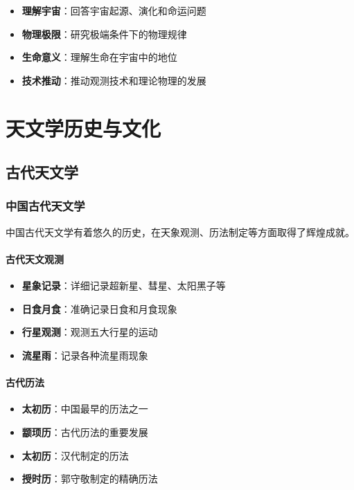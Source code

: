 \documentclass[12pt,UTF8]{ctexbook}
\begin{document}
\begin{itemize}
  \item \textbf{理解宇宙}：回答宇宙起源、演化和命运问题
  \item \textbf{物理极限}：研究极端条件下的物理规律
  \item \textbf{生命意义}：理解生命在宇宙中的地位
  \item \textbf{技术推动}：推动观测技术和理论物理的发展
\end{itemize}

\part{天文学历史与文化}

\chapter{古代天文学}
\section{中国古代天文学}

中国古代天文学有着悠久的历史，在天象观测、历法制定等方面取得了辉煌成就。

\subsection{古代天文观测}

\begin{itemize}
  \item \textbf{星象记录}：详细记录超新星、彗星、太阳黑子等
  \item \textbf{日食月食}：准确记录日食和月食现象
  \item \textbf{行星观测}：观测五大行星的运动
  \item \textbf{流星雨}：记录各种流星雨现象
\end{itemize}

\subsection{古代历法}

\begin{itemize}
  \item \textbf{太初历}：中国最早的历法之一
  \item \textbf{颛顼历}：古代历法的重要发展
  \item \textbf{太初历}：汉代制定的历法
  \item \textbf{授时历}：郭守敬制定的精确历法
\end{itemize}
\end{document}
